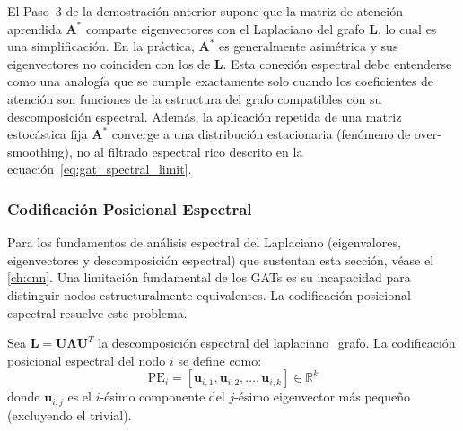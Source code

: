 \begin{remark}
El Paso~3 de la demostración anterior supone que la matriz de atención aprendida $\mathbf{A}^*$ comparte eigenvectores con el Laplaciano del grafo $\mathbf{L}$, lo cual es una simplificación. En la práctica, $\mathbf{A}^*$ es generalmente asimétrica y sus eigenvectores no coinciden con los de $\mathbf{L}$. Esta conexión espectral debe entenderse como una analogía que se cumple exactamente solo cuando los coeficientes de atención son funciones de la estructura del grafo compatibles con su descomposición espectral. Además, la aplicación repetida de una matriz estocástica fija $\mathbf{A}^*$ converge a una distribución estacionaria (fenómeno de over-smoothing), no al filtrado espectral rico descrito en la ecuación~\eqref{eq:gat_spectral_limit}.
\end{remark}

\subsubsection{Codificación Posicional Espectral}\label{subsubsec:codificacion_posicional_espectral}

Para los fundamentos de análisis espectral del Laplaciano (eigenvalores, eigenvectores y descomposición espectral) que sustentan esta sección, véase el \autoref{ch:cnn}. Una limitación fundamental de los \glspl{GAT} es su incapacidad para distinguir nodos estructuralmente equivalentes. La codificación posicional espectral resuelve este problema.

\begin{definition}\label{def:spectral_positional_encoding}
Sea $\mathbf{L} = \mathbf{U}\mathbf{\Lambda}\mathbf{U}^T$ la descomposición espectral del \gls{laplaciano_grafo}. La codificación posicional espectral del nodo $i$ se define como:
\begin{equation}
    \text{PE}_i = [\mathbf{u}_{i,1}, \mathbf{u}_{i,2}, \ldots, \mathbf{u}_{i,k}] \in \mathbb{R}^k
    \label{eq:spectral_positional_encoding}
\end{equation}
donde $\mathbf{u}_{i,j}$ es el $i$-ésimo componente del $j$-ésimo eigenvector más pequeño (excluyendo el trivial).
\end{definition}

